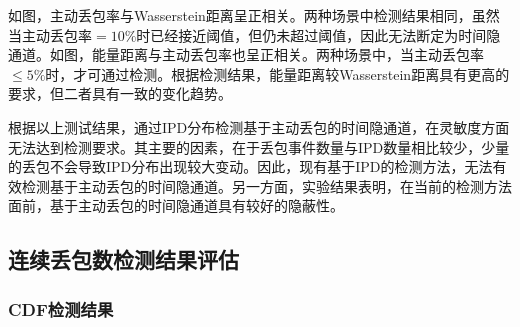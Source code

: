 如图，主动丢包率与Wasserstein距离呈正相关。两种场景中检测结果相同，虽然当主动丢包率$=10\%$时已经接近阈值，但仍未超过阈值，因此无法断定为时间隐通道。如图，能量距离与主动丢包率也呈正相关。两种场景中，当主动丢包率$\le 5\%$时，才可通过检测。根据检测结果，能量距离较Wasserstein距离具有更高的要求，但二者具有一致的变化趋势。

根据以上测试结果，通过IPD分布检测基于主动丢包的时间隐通道，在灵敏度方面无法达到检测要求。其主要的因素，在于丢包事件数量与IPD数量相比较少，少量的丢包不会导致IPD分布出现较大变动。因此，现有基于IPD的检测方法，无法有效检测基于主动丢包的时间隐通道。另一方面，实验结果表明，在当前的检测方法面前，基于主动丢包的时间隐通道具有较好的隐蔽性。

\subsection{连续丢包数检测结果评估}
\label{chap:analyze:result:burst}

\subsubsection{CDF检测结果}
\label{chap:analyze:result:burst:cdf}


